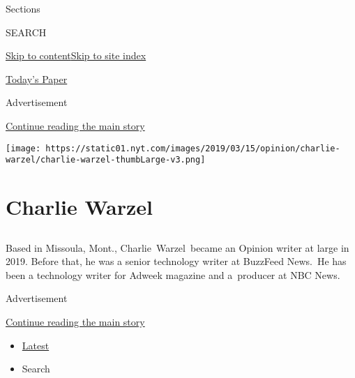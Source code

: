 Sections

SEARCH

\protect\hyperlink{site-content}{Skip to
content}\protect\hyperlink{site-index}{Skip to site index}

\href{https://myaccount.nytimes.com/auth/login?response_type=cookie\&client_id=vi}{}

\href{https://www.nytimes.com/section/todayspaper}{Today's Paper}

Advertisement

\protect\hyperlink{after-top}{Continue reading the main story}

\texttt{[image: https://static01.nyt.com/images/2019/03/15/opinion/charlie-warzel/charlie-warzel-thumbLarge-v3.png]}

\hypertarget{charlie-warzel}{%
\section{Charlie Warzel}\label{charlie-warzel}}

\subsection{}

Based in Missoula, Mont., Charlie~Warzel~became an Opinion writer at
large in 2019. Before that, he was a senior technology writer at
BuzzFeed News.~He has been a technology writer for Adweek magazine and
a~producer at NBC News.

Advertisement

\protect\hyperlink{after-mid1}{Continue reading the main story}

\begin{itemize}
\tightlist
\item
  \protect\hyperlink{stream-panel}{Latest}
\item
  Search
\end{itemize}

